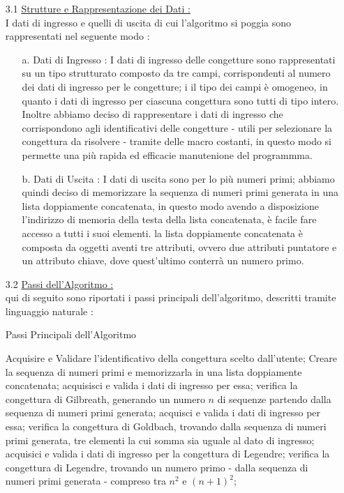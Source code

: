 \documentclass{article}
\begin{document}
    \begin{enumerate}
    \Large \item[3.1] \underline{Strutture e Rappresentazione dei Dati : } 
    \large \\I dati di ingresso e quelli di uscita di cui l'algoritmo si poggia sono rappresentati nel seguente modo : 
    \begin{enumerate}
        \item[a.] Dati di Ingresso : I dati di ingresso delle congetture sono rappresentati su un tipo strutturato composto da tre campi, corrispondenti al numero dei dati di ingresso per le congetture; i il tipo dei campi è omogeneo, in quanto i dati di ingresso per ciascuna congettura sono tutti di tipo intero. Inoltre abbiamo deciso di rappresentare i dati di ingresso che corrispondono agli identificativi delle congetture - utili per selezionare la congettura da risolvere - tramite delle macro costanti, in questo modo si permette una più rapida ed efficacie manutenione del programmma.
        \item[b.] Dati di Uscita : I dati di uscita sono per lo più numeri primi; abbiamo quindi deciso di memorizzare la sequenza di numeri primi generata in una lista doppiamente concatenata, in questo modo avendo a disposizione l'indirizzo di memoria della testa della lista concatenata, è facile fare accesso a tutti i suoi elementi. la lista doppiamente concatenata è composta da oggetti aventi tre attributi, ovvero due attributi puntatore e un attributo chiave, dove quest'ultimo conterrà un numero primo. 
    \end{enumerate}
    \Large \item[3.2] \underline{Passi dell'Algoritmo : }
    \large\\ qui di seguito sono riportati i passi principali dell'algoritmo, descritti tramite linguaggio naturale : 

    \begin{algorithm} [hbt!]
    \caption{Passi Principali dell'Algoritmo}
    \begin{algorithmic}
    \State Acquisire e Validare l'identificativo della congettura scelto dall'utente;
    \State Creare la sequenza di numeri primi e memorizzarla in una lista doppiamente concatenata;
    \State acquisisci e valida i dati di ingresso per essa;
    \State verifica la congettura di Gilbreath, generando un numero $n$ \State di sequenze partendo dalla sequenza di numeri primi generata;
    \State acquisci e valida i dati di ingresso per essa;
    \State verifica la congettura di Goldbach, trovando dalla \State sequenza di numeri primi generata, tre elementi \State la cui somma sia uguale al dato di ingresso;
    \Else
    \State acquisici e valida i dati di ingresso per la congettura di Legendre;
    \State verifica la congettura di Legendre, trovando un numero primo - \State dalla sequenza di numeri primi generata - compreso tra \State $n^2$ e $(n + 1)^2$;
    \EndIf 
    

\end{algorithmic}
\end{algorithm}
\end{enumerate}
\end{document}
